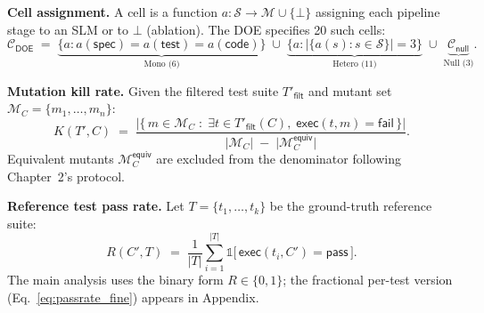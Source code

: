 
\textbf{Cell assignment.} A cell is a function
$a : \mathcal{S} \to \mathcal{M} \cup \{\bot\}$
assigning each pipeline stage to an SLM or to $\bot$ (ablation). The DOE
specifies 20 such cells:
\begin{equation}
  \mathcal{C}_{\textsf{DOE}} \;=\;
  \underbrace{\bigl\{a : a(\textsf{spec}) = a(\textsf{test}) = a(\textsf{code})\bigr\}}_{\text{Mono (6)}}
  \;\cup\;
  \underbrace{\bigl\{a : |\{a(s) : s \in \mathcal{S}\}| = 3\bigr\}}_{\text{Hetero (11)}}
  \;\cup\;
  \underbrace{\mathcal{C}_{\textsf{null}}}_{\text{Null (3)}}.
  \label{eq:doe}
\end{equation}


\textbf{Mutation kill rate.} Given the filtered test suite
$T'_{\textsf{filt}}$ and mutant set $\mathcal{M}_C = \{m_1, \ldots, m_n\}$:
\begin{equation}
  K(T', C)
  \;=\;
  \frac{\bigl|\{\, m \in \mathcal{M}_C \;:\; \exists t \in T'_{\textsf{filt}}(C),\; \textsf{exec}(t, m) = \textsf{fail} \,\}\bigr|}{\bigl|\mathcal{M}_C\bigr| \;-\; \bigl|\mathcal{M}_C^{\textsf{equiv}}\bigr|}.
  \label{eq:killrate}
\end{equation}
Equivalent mutants $\mathcal{M}_C^{\textsf{equiv}}$ are excluded from the
denominator following Chapter~2's protocol.


\textbf{Reference test pass rate.} Let $T = \{t_1, \ldots, t_k\}$ be the
ground-truth reference suite:
\begin{equation}
  R(C', T)
  \;=\;
  \frac{1}{|T|}\sum_{i=1}^{|T|} \mathds{1}\!\bigl[\,\textsf{exec}(t_i, C') = \textsf{pass}\,\bigr].
  \label{eq:passrate}
\end{equation}
The main analysis uses the binary form $R \in \{0, 1\}$; the fractional
per-test version (Eq.~\ref{eq:passrate_fine}) appears in Appendix.

